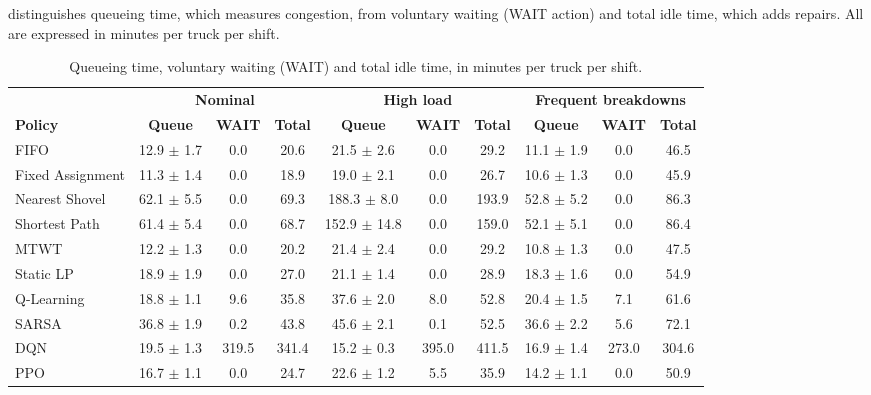 \documentclass[11pt,a4paper]{article}
\newif\ifrevmarks
\newcommand{\revtag}[1]{\ifrevmarks\textsuperscript{\textcolor{red!70!black}{\scriptsize[#1]}}\fi}
\newenvironment{revbloc}[1]{\par\ifrevmarks\color{revcolor}\noindent\revtag{#1}\ \fi}{\par}
\newif\ifcorrmarks
\newcommand{\corr}[1]{\ifcorrmarks\textcolor{corrcolor}{#1}\else#1\fi}
\begin{document}
\begin{revbloc}{T31}
 distinguishes queueing time, which measures congestion, from voluntary waiting (WAIT action) and total idle time, which adds repairs. All are expressed in minutes per truck per shift.

\begin{table}[H]
\centering
\caption{Queueing time, voluntary waiting (WAIT) and total idle time, in minutes per truck per shift.}
\label{tab:waiting}
\scriptsize
\setlength{\tabcolsep}{3pt}
\begin{tabular}{@{}lccc|ccc|ccc@{}}
\toprule
 & \multicolumn{3}{c|}{\textbf{Nominal}} & \multicolumn{3}{c|}{\textbf{High load}} & \multicolumn{3}{c}{\textbf{Frequent breakdowns}} \\
\textbf{Policy} & \textbf{Queue} & \textbf{WAIT} & \textbf{Total} & \textbf{Queue} & \textbf{WAIT} & \textbf{Total} & \textbf{Queue} & \textbf{WAIT} & \textbf{Total} \\
\midrule
FIFO                 & 12.9 $\pm$ 1.7 & 0.0 & 20.6 & 21.5 $\pm$ 2.6 & 0.0 & 29.2 & 11.1 $\pm$ 1.9 & 0.0 & 46.5 \\
Fixed Assignment     & 11.3 $\pm$ 1.4 & 0.0 & 18.9 & 19.0 $\pm$ 2.1 & 0.0 & 26.7 & 10.6 $\pm$ 1.3 & 0.0 & 45.9 \\
Nearest Shovel       & 62.1 $\pm$ 5.5 & 0.0 & 69.3 & 188.3 $\pm$ 8.0 & 0.0 & 193.9 & 52.8 $\pm$ 5.2 & 0.0 & 86.3 \\
Shortest Path        & 61.4 $\pm$ 5.4 & 0.0 & 68.7 & 152.9 $\pm$ 14.8 & 0.0 & 159.0 & 52.1 $\pm$ 5.1 & 0.0 & 86.4 \\
MTWT                 & 12.2 $\pm$ 1.3 & 0.0 & 20.2 & 21.4 $\pm$ 2.4 & 0.0 & 29.2 & 10.8 $\pm$ 1.3 & 0.0 & 47.5 \\
\corr{Static LP}                   & 18.9 $\pm$ 1.9 & 0.0 & 27.0 & 21.1 $\pm$ 1.4 & 0.0 & 28.9 & 18.3 $\pm$ 1.6 & 0.0 & 54.9 \\
\midrule
Q-Learning           & 18.8 $\pm$ 1.1 & 9.6 & 35.8 & 37.6 $\pm$ 2.0 & 8.0 & 52.8 & 20.4 $\pm$ 1.5 & 7.1 & 61.6 \\
SARSA                & 36.8 $\pm$ 1.9 & 0.2 & 43.8 & 45.6 $\pm$ 2.1 & 0.1 & 52.5 & 36.6 $\pm$ 2.2 & 5.6 & 72.1 \\
DQN                  & 19.5 $\pm$ 1.3 & 319.5 & 341.4 & 15.2 $\pm$ 0.3 & 395.0 & 411.5 & 16.9 $\pm$ 1.4 & 273.0 & 304.6 \\
PPO                  & 16.7 $\pm$ 1.1 & 0.0 & 24.7 & 22.6 $\pm$ 1.2 & 5.5 & 35.9 & 14.2 $\pm$ 1.1 & 0.0 & 50.9 \\
\bottomrule
\end{tabular}
\end{table}


\end{revbloc}
\end{document}
